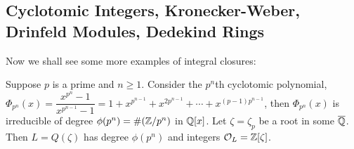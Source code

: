 \newpage
\subsection{Cyclotomic Integers, Kronecker-Weber, Drinfeld Modules, Dedekind Rings\label{sec:620_5}}

Now we shall see some more examples of integral closures:

\begin{thm}
Suppose $p$ is a prime and $n \geq 1$. Consider the $p^n$th cyclotomic polynomial, $\Phi_{p^n}(x)= \dfrac{x^{p^n}-1}{x^{p^{n-1}}-1}= 1+x^{p^{n-1}}+ x^{2p^{n-1}}+ \cdots + x^{(p-1)p^{n-1}}$, then $\Phi_{p^n}(x)$ is irreducible of degree $\phi(p^n)=\#(\mathbb{Z}/p^n)$ in $\mathbb{Q}[x]$. Let $\zeta=\zeta_p$ be a root in some $\overline{\mathbb{Q}}$. Then $L=Q(\zeta)$ has degree $\phi(p^n)$ and integers $\mathcal{O}_L=\mathbb{Z}[\zeta]$. 
\end{thm}


